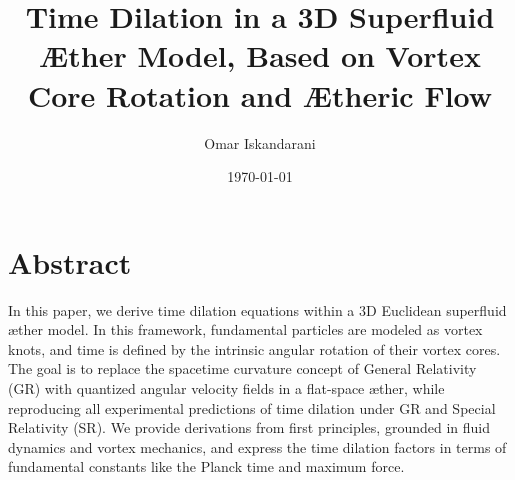 \documentclass[12pt]{article}
\author{Omar Iskandarani}
\title{Time Dilation in a 3D Superfluid Æther Model, Based on Vortex Core Rotation and Ætheric Flow}
\date{\today}
\affiliation{Independent Researcher, Groningen, The Netherlands}
\begin{document}
\maketitle

\section*{Abstract}
In this paper, we derive time dilation equations within a 3D Euclidean superfluid æther model. In this framework, fundamental particles are modeled as vortex knots, and time is defined by the intrinsic angular rotation of their vortex cores. The goal is to replace the spacetime curvature concept of General Relativity (GR) with quantized angular velocity fields in a flat-space æther, while reproducing all experimental predictions of time dilation under GR and Special Relativity (SR). We provide derivations from first principles, grounded in fluid dynamics and vortex mechanics, and express the time dilation factors in terms of fundamental constants like the Planck time and maximum force.










\end{document}
